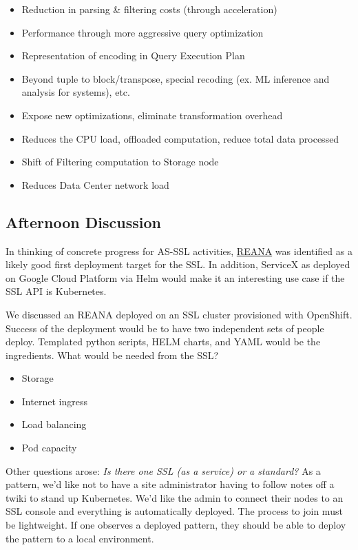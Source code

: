 \documentclass[11pt,letterpaper,fleqn]{article}
\begin{document}
\begin{itemize}
  \item Reduction in parsing \& filtering costs (through acceleration)
  \item Performance through more aggressive query optimization
  \item Representation of encoding in Query Execution Plan
  \item Beyond tuple to block/transpose, special recoding (ex. ML inference and analysis for systems), etc.
  \item Expose new optimizations, eliminate transformation overhead
  \item Reduces the CPU load, offloaded computation, reduce total data processed
  \item Shift of Filtering computation to Storage node
  \item Reduces Data Center network load
\end{itemize}


\subsection{Afternoon Discussion}

In thinking of concrete progress for AS-SSL activities, \href{http://www.reanahub.io/}{REANA} was identified as a likely good first deployment target for the SSL. In addition, ServiceX as deployed on Google Cloud Platform via Helm would make it an interesting use case if the SSL API is Kubernetes.

We discussed an REANA deployed on an SSL cluster provisioned with OpenShift. Success of the deployment would be to have two independent sets of people deploy. Templated python scripts, HELM charts, and YAML would be the ingredients.  What would be needed from the SSL?

\begin{itemize}
  \item Storage
  \item Internet ingress
  \item Load balancing
  \item Pod capacity
\end{itemize}

Other questions arose: {\it Is there one SSL (as a service) or a standard?} As a pattern, we'd like not to have a site administrator having to follow notes off a twiki to stand up Kubernetes. We’d like the admin to connect their nodes to an SSL console and everything is automatically deployed. The process to join must be lightweight. If one observes a deployed pattern, they should be able to deploy the pattern to a local environment.
\end{document}
